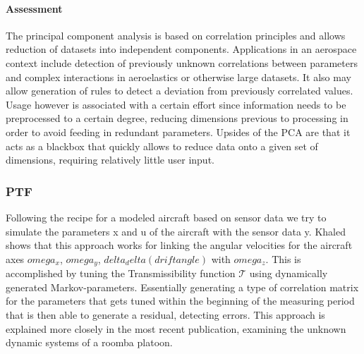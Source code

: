 \paragraph{Assessment}


The principal component analysis is based on correlation principles and allows reduction of datasets into independent components. Applications in an aerospace context include detection of previously unknown correlations between parameters and complex interactions in aeroelastics or otherwise large datasets. It also may allow generation of rules to detect a deviation from previously correlated values. Usage however is associated with a certain effort since information needs to be preprocessed to a certain degree, reducing dimensions previous to processing in order to avoid feeding in redundant parameters. Upsides of the PCA are that it acts as a blackbox that quickly allows to reduce data onto a given set of dimensions, requiring relatively little user input.






\subsubsection{PTF}


Following the recipe for a modeled aircraft based on sensor data we try to simulate the parameters x and u of the aircraft with the sensor data y. Khaled shows that this approach works for linking the angular velocities for the aircraft axes $omega_x$, $omega_y$, $delta_delta(drift angle)$ with $omega_z$. This is accomplished by tuning the Transmissibility function $\mathcal{T}$ using dynamically generated Markov-parameters. Essentially generating a type of correlation matrix for the parameters that gets tuned within the beginning of the measuring period that is then able to generate a residual, detecting errors. This approach is explained more closely in the most recent publication, examining the unknown dynamic systems of a roomba platoon. \cite{khalil_transmissibility-based_2022, khalil_transmissibility-based_2022-1}

